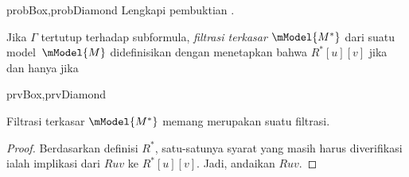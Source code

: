 \documentclass[../../../include/open-logic-section]{subfiles}
\begin{document}
\begin{probtag}{probBox,probDiamond}
  Lengkapi pembuktian .
\end{probtag}

\begin{defn}
  Jika $\Gamma$ tertutup terhadap subformula, \emph{filtrasi terkasar}
  $\mModel{M^*}$ dari suatu model~$\mModel{M}$ didefinisikan dengan
  menetapkan bahwa $R^*[u][v]$ jika dan hanya jika
  \begin{tagenumerate}{prvBox,prvDiamond}
  \end{tagenumerate}
\end{defn}

\begin{prop}
  Filtrasi terkasar $\mModel{M^*}$ memang merupakan suatu filtrasi.
\end{prop}

\begin{proof}
  Berdasarkan definisi $R^*$, satu-satunya syarat yang masih harus
  diverifikasi ialah implikasi dari $Ruv$ ke $R^*[u][v]$. Jadi, andaikan
  $Ruv$. 
\end{proof}
\end{document}
